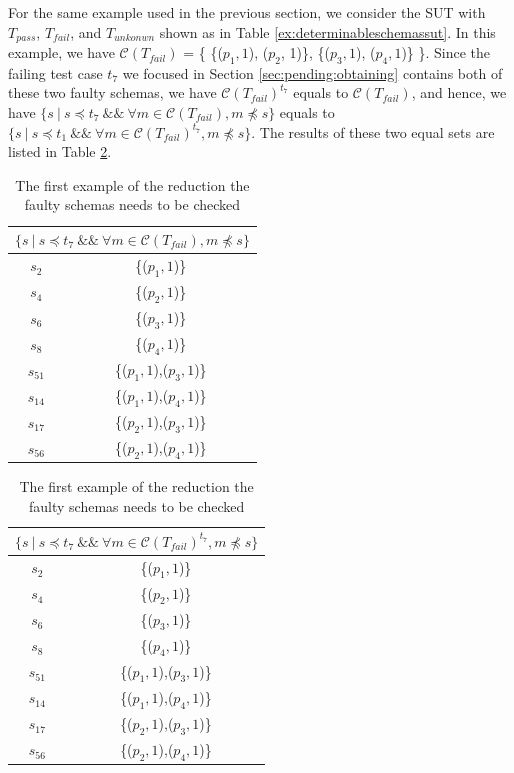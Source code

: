 For the same example used in the previous section, we consider the SUT with $T_{pass}$, $T_{fail}$, and $T_{unkonwn}$ shown as in Table \ref{ex:determinableschemassut}. In this example, we have $\mathcal{C}(T_{fail})$ = \{ \{($p_{1}, 1$), ($p_{2}$, 1)\},  \{($p_{3}, 1$), ($p_{4}, 1$)\} \}. Since the failing test case $t_{7}$ we focused in Section \ref{sec:pending:obtaining} contains both of these two faulty schemas, we have $\mathcal{C}(T_{fail})^{t_{7}}$ equals to $\mathcal{C}(T_{fail})$, and hence, we have $\{ s\ |\  s \preceq t_{7}\ \&\&\ \forall m \in \mathcal{C}(T_{fail}),  m \npreceq s \}$  equals to $\{ s\ |\  s \preceq t_{1}\ \&\&\ \forall m \in \mathcal{C}(T_{fail})^{t_{7}},  m \npreceq s \}$. The results of these two equal sets are listed in Table \ref{ex:mfssintequalfirst}.

\begin{table}[htbp]
  \centering
  \caption{The first example of the reduction the faulty schemas needs to be checked}
  \label{ex:mfssintequalfirst}
    \begin{tabular}{|c|c|} \hline
     \multicolumn{2}{|c|}{$\{ s\ |\ s \preceq t_{7}\ \&\&\ \forall m \in \mathcal{C}(T_{fail}),  m \npreceq s \}$} \\ \hline
   $s_{2}$ & \{($p_{1}, 1$)\} \\
   $s_{4}$ & \{($p_{2}, 1$)\} \\
   $s_{6}$ & \{($p_{3}, 1$)\} \\
   $s_{8}$ & \{($p_{4}, 1$)\} \\

   $s_{51}$ & \{($p_{1}, 1$),($p_{3}, 1$)\} \\
   $s_{14}$ & \{($p_{1}, 1$),($p_{4}, 1$)\} \\
   $s_{17}$ & \{($p_{2}, 1$),($p_{3}, 1$)\} \\
   $s_{56}$ & \{($p_{2}, 1$),($p_{4}, 1$)\} \\ \hline
    \end{tabular}%
\quad
    \begin{tabular}{|c|c|} \hline
   \multicolumn{2}{|c|}{$\{ s\ |\ s \preceq t_{7}\ \&\&\ \forall m \in \mathcal{C}(T_{fail})^{t_{7}},  m \npreceq s \}$}\\ \hline
   $s_{2}$ & \{($p_{1}, 1$)\} \\
   $s_{4}$ & \{($p_{2}, 1$)\} \\
   $s_{6}$ & \{($p_{3}, 1$)\} \\
   $s_{8}$ & \{($p_{4}, 1$)\} \\

   $s_{51}$ & \{($p_{1}, 1$),($p_{3}, 1$)\} \\
   $s_{14}$ & \{($p_{1}, 1$),($p_{4}, 1$)\} \\
   $s_{17}$ & \{($p_{2}, 1$),($p_{3}, 1$)\} \\
   $s_{56}$ & \{($p_{2}, 1$),($p_{4}, 1$)\} \\ \hline
    \end{tabular}%
\end{table}


